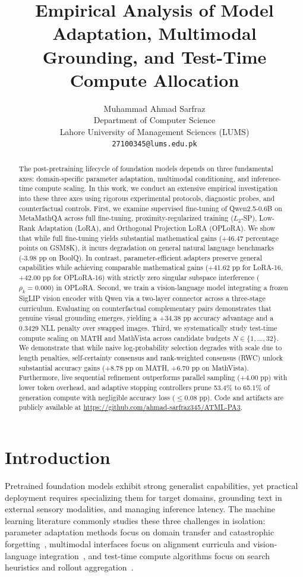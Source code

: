 \documentclass{article}
\title{Empirical Analysis of Model Adaptation, Multimodal Grounding, and Test-Time Compute Allocation}
\author{%
  Muhammad Ahmad Sarfraz \\
  Department of Computer Science \\
  Lahore University of Management Sciences (LUMS) \\
  \texttt{27100345@lums.edu.pk} \\
}
\begin{document}
\maketitle

\begin{abstract}
The post-pretraining lifecycle of foundation models depends on three fundamental axes: domain-specific parameter adaptation, multimodal conditioning, and inference-time compute scaling. In this work, we conduct an extensive empirical investigation into these three axes using rigorous experimental protocols, diagnostic probes, and counterfactual controls. First, we examine supervised fine-tuning of Qwen2.5-0.6B on MetaMathQA across full fine-tuning, proximity-regularized training ($L_2$-SP), Low-Rank Adaptation (LoRA), and Orthogonal Projection LoRA (OPLoRA). We show that while full fine-tuning yields substantial mathematical gains (+46.47 percentage points on GSM8K), it incurs degradation on general natural language benchmarks (-3.98 pp on BoolQ). In contrast, parameter-efficient adapters preserve general capabilities while achieving comparable mathematical gains (+41.62 pp for LoRA-16, +42.00 pp for OPLoRA-16) with strictly zero singular subspace interference ($\rho_k = 0.000$) in OPLoRA. Second, we train a vision-language model integrating a frozen SigLIP vision encoder with Qwen via a two-layer connector across a three-stage curriculum. Evaluating on counterfactual complementary pairs demonstrates that genuine visual grounding emerges, yielding a +34.38 pp accuracy advantage and a 0.3429 NLL penalty over swapped images. Third, we systematically study test-time compute scaling on MATH and MathVista across candidate budgets $N \in \{1, \dots, 32\}$. We demonstrate that while naive log-probability selection degrades with scale due to length penalties, self-certainty consensus and rank-weighted consensus (RWC) unlock substantial accuracy gains (+8.78 pp on MATH, +6.70 pp on MathVista). Furthermore, live sequential refinement outperforms parallel sampling (+4.00 pp) with lower token overhead, and adaptive stopping controllers prune 53.4\% to 65.1\% of generation compute with negligible accuracy loss ($\le 0.08$ pp). Code and artifacts are publicly available at \url{https://github.com/ahmad-sarfraz345/ATML-PA3}.
\end{abstract}

\section{Introduction}
Pretrained foundation models exhibit strong generalist capabilities, yet practical deployment requires specializing them for target domains, grounding text in external sensory modalities, and managing inference latency. The machine learning literature commonly studies these three challenges in isolation: parameter adaptation methods focus on domain transfer and catastrophic forgetting~\cite{hu2022lora, xiong2024oplora, li2018l2sp}, multimodal interfaces focus on alignment curricula and vision-language integration~\cite{liu2023visual, goyal2017making}, and test-time compute algorithms focus on search heuristics and rollout aggregation~\cite{wang2023selfconsistency, kang2024scalable, usman2024visconf, madaan2023selfrefine}.
\end{document}
